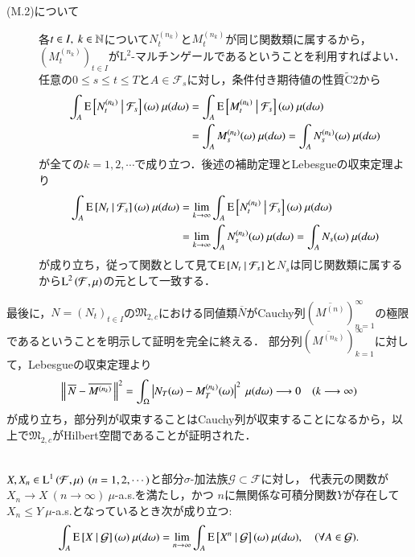 \begin{description}
\begin{description}
				\item[(M.2)について]
					各$t \in I,\ k \in \mathbb{N}$について$N^{(n_k)}_t$と$M^{(n_k)}_t$が同じ関数類に属するから，$(M^{(n_k)}_t)_{t \in I}$が$\mathrm{L}^2$-マルチンゲールであるということを利用すればよい．
					任意の$0 \leq s \leq t \leq T$と$A \in \mathcal{F}_s$に対し，条件付き期待値の性質$\tilde{\mathrm{C}}2$から
					\begin{align}
						\int_{A} \cexp{N^{(n_k)}_t}{\mathcal{F}_s}(\omega)\ \mu(d\omega) &= \int_{A} \cexp{M^{(n_k)}_t}{\mathcal{F}_s}(\omega)\ \mu(d\omega) \\
						&= \int_{A} M^{(n_k)}_s(\omega)\ \mu(d\omega) = \int_{A} N^{(n_k)}_s(\omega)\ \mu(d\omega)
					\end{align}
					が全ての$k = 1,2,\cdots$で成り立つ．後述の補助定理とLebesgueの収束定理より
					\begin{align}
						\int_{A} \cexp{N_t}{\mathcal{F}_s}(\omega)\ \mu(d\omega)
						&= \lim_{k \to \infty} \int_{A} \cexp{N^{(n_k)}_t}{\mathcal{F}_s}(\omega)\ \mu(d\omega) \\
						&= \lim_{k \to \infty} \int_{A} N^{(n_k)}_s(\omega)\ \mu(d\omega)
						= \int_{A} N_s(\omega)\ \mu(d\omega)
					\end{align}
					が成り立ち，従って関数として見て$\operatorname{E} \left[ N_t \ \middle|\ \mathcal{F}_s \right]$と$N_s$は同じ関数類に属するから$\operatorname{L}^{2} \left(\mathcal{F},\mu\right)$の元として一致する．
			\end{description}
			
			最後に，$N=(N_t)_{t \in I}$の$\mathfrak{M}_{2,c}$における同値類$\overline{N}$がCauchy列$(\overline{M^{(n)}})_{n=1}^{\infty}$の極限であるということを明示して証明を完全に終える．
			部分列$(\overline{M^{(n_k)}})_{k=1}^{\infty}$に対して，Lebesgueの収束定理より
			\begin{align}
				\Norm{\overline{N} - \overline{M^{(n_k)}}}{}^2 = \int_{\Omega} \left| N_T(\omega) - M^{(n_k)}_T(\omega) \right|^2\ \mu(d\omega) \longrightarrow 0 \quad (k \longrightarrow \infty)
			\end{align}
			が成り立ち，部分列が収束することはCauchy列が収束することになるから，以上で$\mathfrak{M}_{2,c}$がHilbert空間であることが証明された．
			\QED
	\end{description}
	
	\begin{itembox}[l]{}
		\begin{lem}[条件付き期待値の収束定理]\mbox{}\\
			$X,X_n \in \Lp{1}{\mathcal{F},\mu}\ (n=1,2,\cdots)$と部分$\sigma$-加法族$\mathcal{G} \subset \mathcal{F}$に対し，
			代表元の関数が$X_n \longrightarrow X\ (n \longrightarrow \infty)\ \mu$-a.s.を満たし，かつ
			$n$に無関係な可積分関数$Y$が存在して$X_n \leq Y\ \mu$-a.s.となっているとき次が成り立つ:
			\begin{align}
				\int_A \operatorname{E} \left[ X \ \middle|\ \mathcal{G} \right](\omega)\ \mu(d\omega) = \lim_{n \to \infty} \int_A \operatorname{E} \left[ X^n \ \middle|\ \mathcal{G} \right](\omega)\ \mu(d\omega) , \quad (\forall A \in \mathcal{G}) .
			\end{align}
		\end{lem}
	\end{itembox}
	
